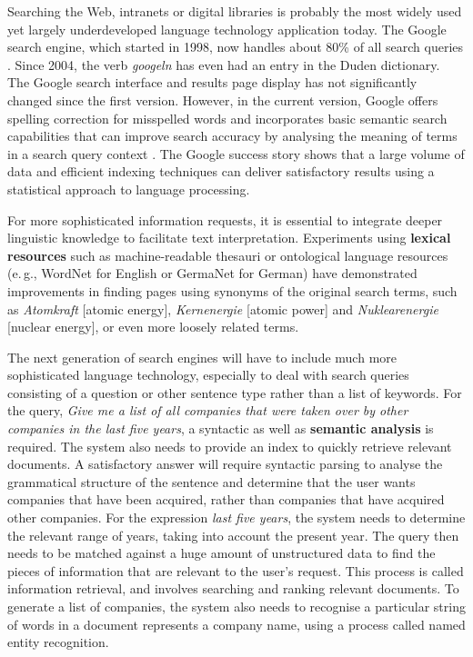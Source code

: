 \begin{multicols}{2}
Searching the Web, intranets or digital libraries is probably the most widely used yet largely underdeveloped language technology application today. The Google search engine, which started in 1998, now handles about 80\% of all search queries \cite{spi1}. Since 2004, the verb \textit{googeln} has even had an entry in the Duden dictionary. The Google search interface and results page display has not significantly changed since the first version. However, in the current version, Google offers spelling correction for misspelled words and incorporates basic semantic search capabilities that can improve search accuracy by analysing the meaning of terms in a search query context \cite{pc1}. The Google success story shows that a large volume of data and efficient indexing techniques can deliver satisfactory results using a statistical approach to language processing. 

For more sophisticated information requests, it is essential to integrate deeper linguistic knowledge to facilitate text interpretation. Experiments using \textbf{lexical resources} such as machine-readable thesauri or ontological language resources (e.\,g., WordNet for English or GermaNet for German) have demonstrated improvements in finding pages using synonyms of the original search terms, such as \textit{Atomkraft} {[}atomic energy{]}, \textit{Kernenergie} {[}atomic power{]} and \textit{Nuklearenergie} {[}nuclear energy{]}, or even more loosely related terms.


The next generation of search engines will have to include much more sophisticated language technology, especially to deal with search queries consisting of a question or other sentence type rather than a list of keywords. For the query, \textit{Give me a list of all companies that were taken over by other companies in the last five years}, a syntactic as well as \textbf{semantic analysis} is required. The system also needs to provide an index to quickly retrieve relevant documents. A satisfactory answer will require syntactic parsing to analyse the grammatical structure of the sentence and determine that the user wants companies that have been acquired, rather than companies that have acquired other companies. For the expression \textit{last five years}, the system needs to determine the relevant range of years, taking into account the present year. The query then needs to be matched against a huge amount of unstructured data to find the pieces of information that are relevant to the user’s request. This process is called information retrieval, and involves searching and ranking relevant documents. To generate a list of companies, the system also needs to recognise a particular string of words in a document represents a company name, using a process called named entity recognition.


\end{multicols}
